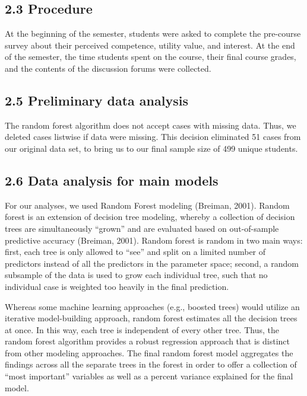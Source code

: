 \documentclass[,acmart]{apa6}
\begin{document}
\subsection{2.3 Procedure}\label{procedure}

At the beginning of the semester, students were asked to complete the
pre-course survey about their perceived competence, utility value, and
interest. At the end of the semester, the time students spent on the
course, their final course grades, and the contents of the discussion
forums were collected.

\subsection{2.5 Preliminary data
analysis}\label{preliminary-data-analysis}

The random forest algorithm does not accept cases with missing data.
Thus, we deleted cases listwise if data were missing. This decision
eliminated 51 cases from our original data set, to bring us to our final
sample size of 499 unique students.

\subsection{2.6 Data analysis for main
models}\label{data-analysis-for-main-models}

For our analyses, we used Random Forest modeling (Breiman, 2001). Random
forest is an extension of decision tree modeling, whereby a collection
of decision trees are simultaneously \enquote{grown} and are evaluated
based on out-of-sample predictive accuracy (Breiman, 2001). Random
forest is random in two main ways: first, each tree is only allowed to
\enquote{see} and split on a limited number of predictors instead of all
the predictors in the parameter space; second, a random subsample of the
data is used to grow each individual tree, such that no individual case
is weighted too heavily in the final prediction.

Whereas some machine learning approaches (e.g., boosted trees) would
utilize an iterative model-building approach, random forest estimates
all the decision trees at once. In this way, each tree is independent of
every other tree. Thus, the random forest algorithm provides a robust
regression approach that is distinct from other modeling approaches. The
final random forest model aggregates the findings across all the
separate trees in the forest in order to offer a collection of
\enquote{most important} variables as well as a percent variance
explained for the final model.
\end{document}
